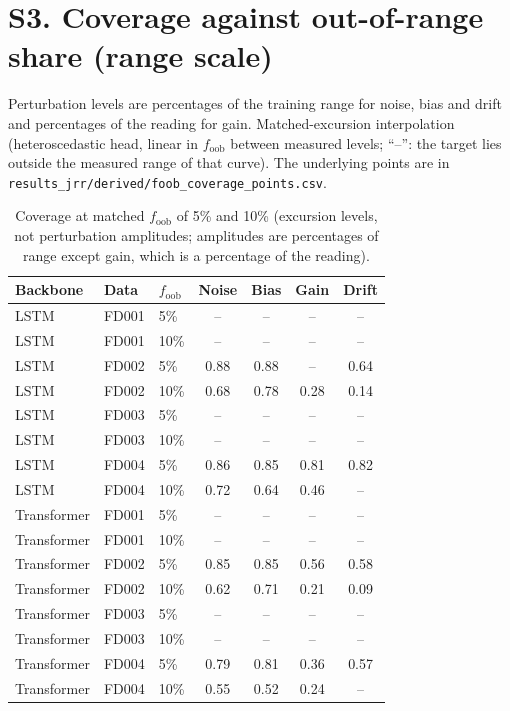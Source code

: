 \documentclass[10pt,a4paper]{article}
\begin{document}
\section*{S3. Coverage against out-of-range share (range scale)}
Perturbation levels are percentages of the training range for noise, bias and drift and percentages of the reading for gain. Matched-excursion interpolation (heteroscedastic head, linear in $f_{\mathrm{oob}}$ between measured levels; ``--'': the target lies outside the measured range of that curve). The underlying points are in \texttt{results\_jrr/derived/foob\_coverage\_points.csv}.
\begin{table}[H]\centering\scriptsize
\caption{Coverage at matched $f_{\mathrm{oob}}$ of 5\% and 10\% (excursion levels, not perturbation amplitudes; amplitudes are percentages of range except gain, which is a percentage of the reading).}
\begin{tabular}{lllcccc}\toprule
Backbone & Data & $f_{\mathrm{oob}}$ & Noise & Bias & Gain & Drift \\ \midrule
LSTM & FD001 & 5\% & -- & -- & -- & -- \\
LSTM & FD001 & 10\% & -- & -- & -- & -- \\
LSTM & FD002 & 5\% & 0.88 & 0.88 & -- & 0.64 \\
LSTM & FD002 & 10\% & 0.68 & 0.78 & 0.28 & 0.14 \\
LSTM & FD003 & 5\% & -- & -- & -- & -- \\
LSTM & FD003 & 10\% & -- & -- & -- & -- \\
LSTM & FD004 & 5\% & 0.86 & 0.85 & 0.81 & 0.82 \\
LSTM & FD004 & 10\% & 0.72 & 0.64 & 0.46 & -- \\
Transformer & FD001 & 5\% & -- & -- & -- & -- \\
Transformer & FD001 & 10\% & -- & -- & -- & -- \\
Transformer & FD002 & 5\% & 0.85 & 0.85 & 0.56 & 0.58 \\
Transformer & FD002 & 10\% & 0.62 & 0.71 & 0.21 & 0.09 \\
Transformer & FD003 & 5\% & -- & -- & -- & -- \\
Transformer & FD003 & 10\% & -- & -- & -- & -- \\
Transformer & FD004 & 5\% & 0.79 & 0.81 & 0.36 & 0.57 \\
Transformer & FD004 & 10\% & 0.55 & 0.52 & 0.24 & -- \\
\bottomrule\end{tabular}
\end{table}
\end{document}
